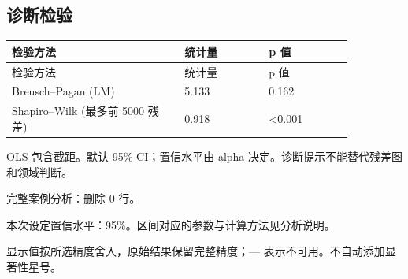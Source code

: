 \documentclass[UTF8]{ctexart}
\begin{document}
\subsection*{诊断检验}
\small
\setlength{\tabcolsep}{2pt}
\begin{longtable}{p{0.4300\linewidth}p{0.2150\linewidth}p{0.2150\linewidth}}
\toprule
检验方法 & 统计量 & p 值 \\
\midrule
\endfirsthead
\toprule
检验方法 & 统计量 & p 值 \\
\midrule
\endhead
Breusch–Pagan (LM) & 5.133 & 0.162 \\
Shapiro–Wilk (最多前 5000 残差) & 0.918 & \textless{}0.001 \\
\bottomrule
\end{longtable}
\noindent OLS 包含截距。默认 95\% CI；置信水平由 alpha 决定。诊断提示不能替代残差图和领域判断。\par
\noindent 完整案例分析：删除 0 行。\par
\noindent 本次设定置信水平：95\%。区间对应的参数与计算方法见分析说明。\par
\noindent 显示值按所选精度舍入，原始结果保留完整精度；— 表示不可用。不自动添加显著性星号。\par
\end{document}
